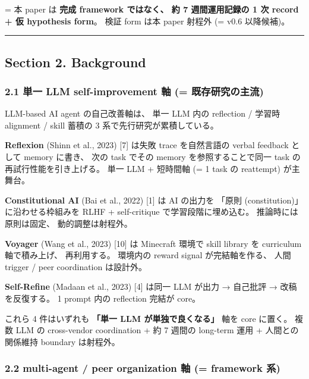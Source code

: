 \documentclass[
]{article}
\begin{document}
= 本 paper は \textbf{完成 framework ではなく、 約 7 週間運用記録の 1 次
record + 仮 hypothesis form}。 検証 form は本 paper 射程外 (= v0.6
以降候補)。

\begin{center}\rule{0.5\linewidth}{0.5pt}\end{center}

\subsection{Section 2. Background}\label{section-2.-background}

\subsubsection{2.1 単一 LLM self-improvement 軸 (=
既存研究の主流)}\label{ux5358ux4e00-llm-self-improvement-ux8ef8-ux65e2ux5b58ux7814ux7a76ux306eux4e3bux6d41}

LLM-based AI agent の自己改善軸は、 単一 LLM 内の reflection / 学習時
alignment / skill 蓄積の 3 系で先行研究が累積している。

\textbf{Reflexion} (Shinn et al., 2023) {[}7{]} は失敗 trace
を自然言語の verbal feedback として memory に書き、 次の task でその
memory を参照することで同一 task の再試行性能を引き上げる。 単一 LLM +
短時間軸 (= 1 task の reattempt) が主舞台。

\textbf{Constitutional AI} (Bai et al., 2022) {[}1{]} は AI の出力を
「原則 (constitution)」 に沿わせる枠組みを RLHF + self-critique
で学習段階に埋め込む。 推論時には原則は固定、 動的調整は射程外。

\textbf{Voyager} (Wang et al., 2023) {[}10{]} は Minecraft 環境で skill
library を curriculum 軸で積み上げ、 再利用する。 環境内の reward signal
が完結軸を作る、 人間 trigger / peer coordination は設計外。

\textbf{Self-Refine} (Madaan et al., 2023) {[}4{]} は同一 LLM が出力 →
自己批評 → 改稿を反復する。 1 prompt 内の reflection 完結が core。

これら 4 件はいずれも \textbf{「単一 LLM が単独で良くなる」} 軸を core
に置く。 複数 LLM の cross-vendor coordination + 約 7 週間の long-term
運用 + 人間との関係維持 boundary は射程外。

\subsubsection{2.2 multi-agent / peer organization 軸 (= framework
系)}\label{multi-agent-peer-organization-ux8ef8-framework-ux7cfb}
\end{document}
